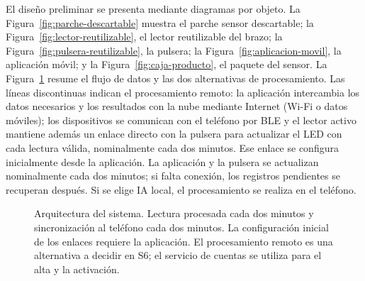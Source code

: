 El diseño preliminar se presenta mediante diagramas por objeto.
La Figura~\ref{fig:parche-descartable} muestra el parche sensor
 descartable; la Figura~\ref{fig:lector-reutilizable}, el lector
reutilizable del brazo; la Figura~\ref{fig:pulsera-reutilizable},
la pulsera; la Figura~\ref{fig:aplicacion-movil}, la aplicación
móvil; y la Figura~\ref{fig:caja-producto}, el paquete del sensor.
La Figura~\ref{fig:arquitectura-sistema} resume el flujo de datos y las dos alternativas de procesamiento. Las líneas discontinuas indican el procesamiento remoto: la aplicación intercambia los datos necesarios y los resultados con la nube mediante Internet (Wi-Fi o datos móviles); los dispositivos se comunican con el teléfono por BLE y el lector activo mantiene además un enlace directo con la pulsera para actualizar el LED con cada lectura válida, nominalmente cada dos minutos. Ese enlace se configura inicialmente desde la aplicación. La aplicación y la pulsera se actualizan nominalmente cada dos minutos; si falta conexión, los registros pendientes se recuperan después. Si se elige IA local, el procesamiento se realiza en el teléfono.



\begin{figure}[H]
\centering
{}
\caption{Arquitectura del sistema. Lectura procesada cada dos minutos y sincronización al teléfono cada dos minutos. La configuración inicial de los enlaces requiere la aplicación. El procesamiento remoto es una alternativa a decidir en S6; el servicio de cuentas se utiliza para el alta y la activación.}
\label{fig:arquitectura-sistema}
\end{figure}







